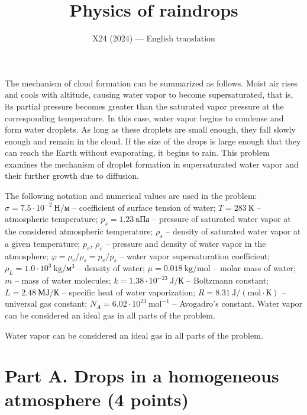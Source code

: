 \documentclass[11pt,a4paper]{article}
\title{\textbf{Physics of raindrops}}
\author{\normalsize X24 (2024) --- English translation}
\date{}
\begin{document}
\maketitle

The mechanism of cloud formation can be summarized as follows. Moist air rises and cools with altitude, causing water vapor to become supersaturated, that is, its partial pressure becomes greater than the saturated vapor pressure at the corresponding temperature. In this case, water vapor begins to condense and form water droplets. As long as these droplets are small enough, they fall slowly enough and remain in the cloud. If the size of the drops is large enough that they can reach the Earth without evaporating, it begins to rain. This problem examines the mechanism of droplet formation in supersaturated water vapor and their further growth due to diffusion.

The following notation and numerical values are used in the problem: $\sigma = 7.5 \cdot 10^{-2} ~\text{Н}/\text{м}$ – coefficient of surface tension of water; $T = 283~\text{К}$ – atmospheric temperature; $p_s = 1.23~\text{кПа}$ – pressure of saturated water vapor at the considered atmospheric temperature; $\rho_s$ – density of saturated water vapor at a given temperature; $p_v$, $\rho_v$ – pressure and density of water vapor in the atmosphere; $\varphi = \rho_v/\rho_s = p_v/p_s$ – water vapor supersaturation coefficient; $\rho_L = 1.0 \cdot 10^3 ~\text{kg}/\text{м}^3$ – density of water; $\mu = 0.018 ~\text{kg}/\text{mol}$ – molar mass of water; $m$ – mass of water molecules; $k = 1.38 \cdot 10^{-23}~\text{J}/\text{К}$ – Boltzmann constant; $L = 2.48 ~\text{МJ}/\text{К}$ – specific heat of water vaporization; $R = 8.31~\text{J}/(\text{mol} \cdot \text{К})$ – universal gas constant; $N_A = 6.02 \cdot 10^{23}~\text{mol}^{-1}$ – Avogadro’s constant. Water vapor can be considered an ideal gas in all parts of the problem.

Water vapor can be considered an ideal gas in all parts of the problem.

\section*{Part A. Drops in a homogeneous atmosphere (4 points)}
\end{document}
